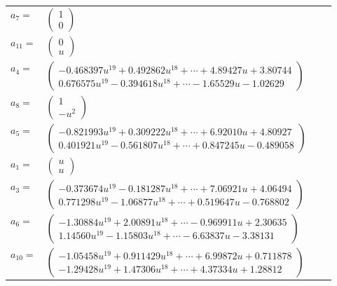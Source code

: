\documentclass[1p]{elsarticle_modified}
\theoremstyle{definition}
\begin{document}
\begin{tabular}{m{7pt} m{180pt} m{7pt} m{180pt} }
\flushright $a_{7}=$&$\begin{pmatrix}1\\0\end{pmatrix}$ \\
\flushright $a_{11}=$&$\begin{pmatrix}0\\u\end{pmatrix}$ \\
\flushright $a_{4}=$&$\begin{pmatrix}-0.468397 u^{19}+0.492862 u^{18}+\cdots+4.89427 u+3.80744\\0.676575 u^{19}-0.394618 u^{18}+\cdots-1.65529 u-1.02629\end{pmatrix}$ \\
\flushright $a_{8}=$&$\begin{pmatrix}1\\- u^2\end{pmatrix}$ \\
\flushright $a_{5}=$&$\begin{pmatrix}-0.821993 u^{19}+0.309222 u^{18}+\cdots+6.92010 u+4.80927\\0.401921 u^{19}-0.561807 u^{18}+\cdots+0.847245 u-0.489058\end{pmatrix}$ \\
\flushright $a_{1}=$&$\begin{pmatrix}u\\u\end{pmatrix}$ \\
\flushright $a_{3}=$&$\begin{pmatrix}-0.373674 u^{19}-0.181287 u^{18}+\cdots+7.06921 u+4.06494\\0.771298 u^{19}-1.06877 u^{18}+\cdots+0.519647 u-0.768802\end{pmatrix}$ \\
\flushright $a_{6}=$&$\begin{pmatrix}-1.30884 u^{19}+2.00891 u^{18}+\cdots-0.969911 u+2.30635\\1.14560 u^{19}-1.15803 u^{18}+\cdots-6.63837 u-3.38131\end{pmatrix}$ \\
\flushright $a_{10}=$&$\begin{pmatrix}-1.05458 u^{19}+0.911429 u^{18}+\cdots+6.99872 u+0.711878\\-1.29428 u^{19}+1.47306 u^{18}+\cdots+4.37334 u+1.28812\end{pmatrix}$ \\

\end{tabular}
\end{document}
